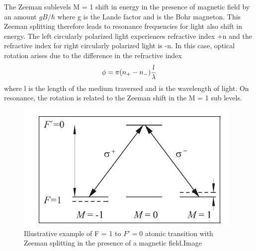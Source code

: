 \documentclass[12pt]{report}
\begin{document}
The Zeeman sublevels M = 1 shift in energy in the presence of magnetic field by an amount $gB/\hbar$ where g is the Lande factor and is the Bohr magneton. This Zeeman splitting therefore leads to resonance frequencies for light also shift in energy. The left circularly polarized light experiences refractive index +n and the refractive index for right circularly polarized light is -n. In this case, optical rotation arises due to the difference in the refractive index 
\begin{equation}
\label{eq:emc}
\phi = \pi(n_+-n_{-})\frac{l}{\lambda} \\
\end{equation}
where l is the length of the medium traversed and is the wavelength of light. On resonance, the rotation is related to the Zeeman shift in the M = 1 sub levels.
\begin{figure}[h]
\centering
\includegraphics[width=0.75\linewidth]{figures/optical_rotation}
\caption{Illustrative example of F = 1 to $F' = 0$ atomic transition with Zeeman
splitting in the presence of a magnetic field.Image\cite{Budker2002JU2}}
\end{figure}
\end{document}
